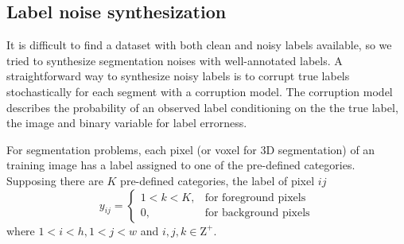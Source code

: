 \subsection{Label noise synthesization}
\label{subsec:noises}

It is difficult to find a dataset with both clean and noisy labels available, so we tried to synthesize segmentation noises with well-annotated labels.
A straightforward way to synthesize noisy labels is to corrupt true labels stochastically for each segment with a corruption model.
The corruption model describes the probability of an observed label conditioning on the the true label, the image and binary variable for label errorness.

For segmentation problems, each pixel (or voxel for 3D segmentation) of an training image has a label assigned to one of the pre-defined categories.
Supposing there are $K$ pre-defined categories, the label of pixel ${ij}$
\[
  y_{ij} =
    \begin{cases}
      1 < k < K, & \text{for foreground pixels} \\
      0, & \text{for background pixels}
    \end{cases}
\]
where $1 < i < h, 1 < j < w$ and $i,j,k \in \mathrm{Z}^+$.




